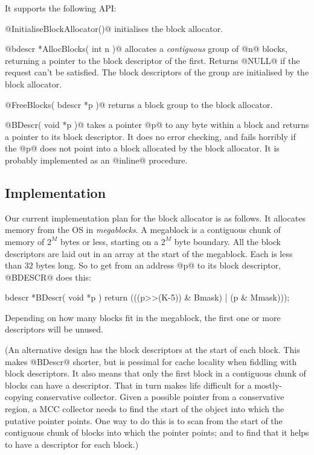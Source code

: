 \documentclass{article}
\newcommand{\block}{block}
\begin{document}
It supports the following API:
\begin{description}
\item{@InitialiseBlockAllocator()@} initialises the \block{} allocator.
\item{@bdescr *AllocBlocks( int n )@} allocates a {\em contiguous}
group of @n@ \block{}s, returning a pointer to the \block{} 
descriptor of the first.  Returns @NULL@ if the request can't be
satisfied.  The block descriptors of the group are initialised by the block allocator.
\item{@FreeBlocks( bdescr *p )@} returns a block group to the block allocator.
\item{@BDescr( void *p )@} takes a pointer @p@ to any
byte within a block{} and returns a pointer to its \block{}
descriptor.  It does no error checking, and fails horribly if the @p@
does not point into a \block{} allocated by the \block{} allocator.
It is probably implemented as an @inline@ procedure.
\end{description}


\subsection{Implementation}

Our current implementation plan for the \block{} allocator is as
follows.  It allocates memory from the OS in {\em megablocks}.  A
megablock is a contiguous chunk of memory of $2^M$ bytes or less,
starting on a $2^M$ byte boundary.  All the \block{} descriptors are
laid out in an array at the start of the megablock.  Each is less than 32 bytes
long.  So to get from an address @p@ to its block descriptor, @BDESCR@
does this:
\begin{code}
  bdescr *BDescr( void *p ) {
	return (((p>>(K-5)) & Bmask) | (p & Mmask)));
  }
\end{code}
Depending on how many \block{}s fit in the megablock, the first
one or more descriptors will be unused.

(An alternative design has the \block{} descriptors at the start of
each \block{}.  This makes @BDescr@ shorter, but is pessimal for
cache locality when fiddling with \block{} descriptors.  
It also means that only the first block in a contiguous chunk of
blocks can have a descriptor.  That in turn makes life difficult
for a mostly-copying conservative collector.  Given a possible pointer
from a conservative region, a MCC collector needs
to find the start of the object into which the putative pointer
points.  One way to do this is to scan from the start of the
contiguous chunk of \block{}s into which the pointer points; and to 
find that it helps to have a descriptor for each \block{}.)
\end{document}
